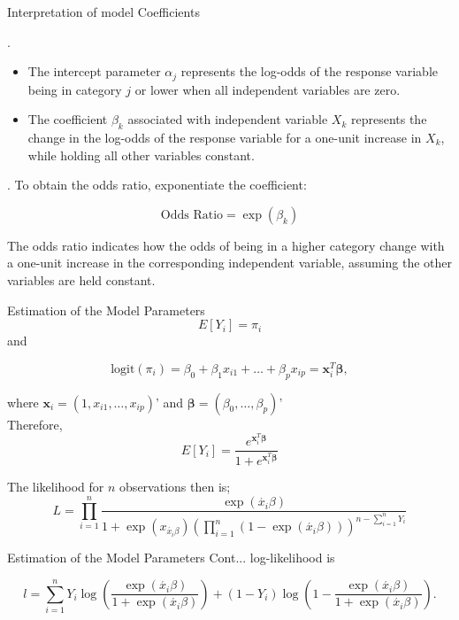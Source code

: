 \documentclass{beamer}
\numberwithin{equation}{section}
\numberwithin{table}{section}
\begin{document}
\begin{frame}{Interpretation of model Coefficients}
\begin{block}{.}
	\begin{itemize}
	\item The intercept parameter $\alpha_j$ represents the log-odds of the response variable being in category $j$ or lower when all independent variables are zero.
	\item The coefficient $\beta_k$ associated with independent variable $X_k$ represents the change in the log-odds of the response variable for a one-unit increase in $X_k$, while holding all other variables constant.
\end{itemize}
\end{block}
\begin{block}{.}
To obtain the odds ratio, exponentiate the coefficient:

\[
\text{Odds Ratio} = \exp(\beta_k)
\]

The odds ratio indicates how the odds of being in a higher category change with a one-unit increase in the corresponding independent variable, assuming the other variables are held constant.
\end{block}
\end{frame}
\begin{frame}{Estimation of the Model Parameters}
\begin{equation}
	E[Y_i] = \pi_i 
	\label{eq:3.7}
\end{equation}
and

\begin{equation}
	\text{logit}(\pi_i) = \beta_0 + \beta_1 x_{i1} + \ldots + \beta_p x_{ip}
	= \mathbf{x}_i^T \boldsymbol{\beta}, 
	\label{eq:3.8}
\end{equation}

where \( \mathbf{x}_i = (1, x_{i1}, \ldots, x_{ip}) \)'
and 
\( \boldsymbol{\beta} = (\beta_0, \ldots, \beta_p) \)'\\
Therefore,
\[ E[Y_i] = \frac{{e^{\mathbf{x}_i^T \boldsymbol{\beta}}}}{{1 + e^{\mathbf{x}_i^T \boldsymbol{\beta}}}} \]

	The likelihood for $n$ observations then is;
\begin{equation}
	L = \prod_{i=1}^{n} \frac{\exp(\acute{x_i}\beta)}{1+\exp(x_{\acute{x_i}\beta})\left(\prod_{i=1}^{n}(1-\exp(\acute{x_i}\beta))\right)^{n-\sum_{i=1}^{n}Y_i}}	
	\label{eq:3.9}
\end{equation}
\end{frame}
\begin{frame}{Estimation of the Model Parameters Cont...}
log-likelihood is

\begin{equation}
	l = \sum_{i=1}^{n} Y_i \log\left(\frac{\exp(\acute{x_i}\beta)}{1 + \exp(\acute{x_i}\beta)}\right) + (1 - Y_i) \log\left(1 - \frac{\exp(\acute{x_i}\beta)}{1 + \exp(\acute{x_i}\beta)}\right).
	\label{eq:3.9}
\end{equation}

\end{frame}
\end{document}
